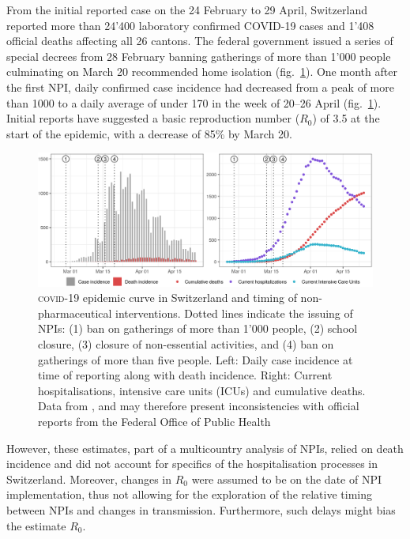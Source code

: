 From the initial reported case on the 24 February to 29 April, Switzerland reported more than 24'400 laboratory confirmed COVID-19 cases and 1'408 official deaths affecting all 26 cantons\cite{OFSP:RapportSituationEpidemiologique:2020}. The federal government issued a series of special decrees from 28 February banning gatherings of more than 1'000 people culminating on March 20 recommended home isolation (fig.~\ref{fig:covid-ch-data}). One month after the first NPI, daily confirmed case incidence had decreased from a peak of more than 1000 to a daily average of under 170 in the week of 20–26 April (fig.~\ref{fig:covid-ch-data}). Initial reports have suggested a basic reproduction number ($R_0$) of 3.5 at the start of the epidemic, with a decrease of 85\% by March 20\cite[-3\baselineskip]{Flaxman:Report13Estimating:2020}.
\begin{figure}\centering
  \includegraphics[width=\textwidth]{fig_covid-switzerland-npi/FIGURE_1.png}
  \caption[\textsc{covid}-19 epidemic curve in Switzerland and timing of interventions]{\textsc{covid}-19 epidemic curve in Switzerland and timing of non-pharmaceutical interventions. Dotted lines indicate the issuing of NPIs: (1) ban on gatherings of more than 1'000 people, (2) school closure, (3) closure of non-essential activities, and (4) ban on gatherings of more than five people. Left: Daily case incidence at time of reporting along with death incidence. Right: Current hospitalisations, intensive care units (ICUs) and cumulative deaths. Data from \textcite{Probst:DaenuprobstCovid19casesswitzerland:2020}, and may therefore present inconsistencies with official reports from the Federal Office of Public Health%
  }
  \label{fig:covid-ch-data}
\end{figure}
 However, these estimates, part of a multicountry analysis of NPIs, relied on death incidence and did not account for specifics of the hospitalisation processes in Switzerland. Moreover, changes in $R_0$ were assumed to be on the date of NPI implementation, thus not allowing for the exploration of the relative timing between NPIs and changes in transmission. Furthermore, such delays might bias the estimate $R_0$. 

